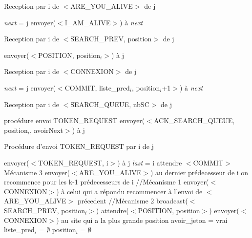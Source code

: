 \documentclass[a4paper,12pt]{report}
\newcommand{\last}{\textit{last} }
\newcommand{\next}{\textit{next} }
\begin{document}
\begin{algorithm}[t]
\caption{Reception par i de $<$ARE\_YOU\_ALIVE$>$ de j}
\label{algo_naimi_trehel_amelioration_recpt_AYA}
\begin{algorithmic}[1]
\STATE \next = j
\STATE envoyer($<$I\_AM\_ALIVE$>$) à \next
\end{algorithmic}
\end{algorithm}


\begin{algorithm}[t]
\caption{Reception par i de $<$SEARCH\_PREV, position$>$ de j}
\label{algo_naimi_trehel_amelioration_recpt_AYA}
\begin{algorithmic}[1]
  \STATE envoyer($<$POSITION, position$_{i}>$) à j
\ENDIF 
\end{algorithmic}
\end{algorithm}


\begin{algorithm}[t]
\caption{Reception par i de $<$CONNEXION$>$ de j}
\label{algo_naimi_trehel_amelioration_recpt_CX}
\begin{algorithmic}[1]
\STATE \next = j
\STATE envoyer($<$COMMIT, liste\_pred$_{i}$, position$_{i}$+1$>$) à \next
\end{algorithmic}
\end{algorithm}

\begin{algorithm}[t]
\caption{Reception par i de $<$SEARCH\_QUEUE, nbSC$>$ de j}
\label{algo_naimi_trehel_amelioration_recpt_SQ}
\begin{algorithmic}[1]
  \STATE procédure envoi TOKEN\_REQUEST
\ELSE
    \STATE envoyer($<$ACK\_SEARCH\_QUEUE, position$_{i}$, avoirNext$>$) à j
  \ENDIF  
\ENDIF   
\end{algorithmic}
\end{algorithm}


\begin{algorithm}[t]
\caption{Procédure d'envoi TOKEN\_REQUEST par i de j}
\label{algo_naimi_trehel_amelioration_envoi_TR}
\begin{algorithmic}[1]
\STATE envoyer($<$TOKEN\_REQUEST, i$>$) à j
\IF{j == \last}
  \STATE \last = i
\ENDIF
\STATE attendre $<$COMMIT$>$
  \STATE Mécanisme 3
\ELSE
  \STATE envoyer($<$ARE\_YOU\_ALIVE$>$) au dernier prédecesseur de i
    \STATE on recommence pour les k-1 prédecesseurs de i
  \ENDIF
    \STATE //Mécanisme 1
    \STATE envoyer($<$CONNEXION$>$) à celui qui a répondu
    \STATE recommencer à l'envoi de $<$ARE\_YOU\_ALIVE$>$ précedent
  \ELSE 
    \STATE //Mécanisme 2
    \STATE broadcast($<$SEARCH\_PREV, position$_{i}>$)
    \STATE attendre($<$POSITION, position$>$)
      \STATE envoyer($<$CONNEXION$>$) au site qui a la plus grande position
    \ELSE
      \STATE avoir\_jeton = vrai
      \STATE liste\_pred$_{i}$ = $\emptyset$
      \STATE position$_{i}$ = $\emptyset$
    \ENDIF
  \ENDIF
\ENDIF
\end{algorithmic}
\end{algorithm}
\end{document}
